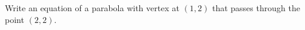 \begin{frame}
\begin{example}
Write an equation of a parabola with vertex at $(1,2)$ that passes through the point $(2,2)$.
\end{example}

\end{frame}